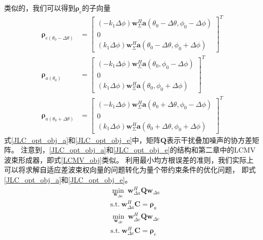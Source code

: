 \documentclass[master]{thesis-uestc}
\begin{document}
类似的，我们可以得到$\bm{\rho}_e$的子向量
\begin{subequations}\label{JLC_sub_cons_vec_e}
    \begin{align}
        \bm{\rho}_{e(\theta_0-\Delta\theta)} &= 
        \begin{bmatrix}
            (-k_1\Delta\phi)\bm{w}^H_\Sigma\bm{a}(\theta_0-\Delta\theta,\phi_0-\Delta\phi) \\
            0 \\
            (k_1\Delta\phi)\bm{w}^H_\Sigma\bm{a}(\theta_0-\Delta\theta,\phi_0+\Delta\phi)
        \end{bmatrix}^T \\
        \bm{\rho}_{a(\theta_0)} &= 
        \begin{bmatrix}
            (-k_1\Delta\phi)\bm{w}^H_\Sigma\bm{a}(\theta_0,\phi_0-\Delta\phi) \\
            0 \\
            (k_1\Delta\phi)\bm{w}^H_\Sigma\bm{a}(\theta_0,\phi_0+\Delta\phi)
        \end{bmatrix}^T \\
        \bm{\rho}_{a(\theta_0+\Delta\theta)} &= 
        \begin{bmatrix}
            (-k_1\Delta\phi)\bm{w}^H_\Sigma\bm{a}(\theta_0+\Delta\theta,\phi_0-\Delta\phi) \\
            0 \\
            (k_1\Delta\phi)\bm{w}^H_\Sigma\bm{a}(\theta_0+\Delta\theta,\phi_0+\Delta\phi)
        \end{bmatrix}^T
    \end{align}
\end{subequations}
式\eqref{JLC_opt_obj_a}和\eqref{JLC_opt_obj_e}中，矩阵$\bm{Q}$表示干扰叠加噪声的协方差矩阵。
注意到，\eqref{JLC_opt_obj_a}和\eqref{JLC_opt_obj_e}的结构和第二章中的LCMV波束形成器，即式\eqref{LCMV_obj}类似。
利用最小均方根误差的准则，我们实际上可以将求解自适应差波束权向量的问题转化为量个带约束条件的优化问题，
即式\eqref{JLC_opt_obj_a}和\eqref{JLC_opt_obj_e}。
\begin{equation}\label{JLC_opt_obj_a}
    \begin{aligned}
        &\min_{\bm{w}_{\Delta a}} ~ \bm{w}_{\Delta a}^H\bm{Q}\bm{w}_{\Delta a} \\
        &\text{s.t.} ~ \bm{w}_{\Delta a}^H\bm{C} = \bm{\rho}_a
    \end{aligned}
\end{equation}
\begin{equation}\label{JLC_opt_obj_e}
    \begin{aligned}
        &\min_{\bm{w}_{\Delta e}} ~ \bm{w}_{\Delta e}^H\bm{Q}\bm{w}_{\Delta e} \\
        &\text{s.t.} ~ \bm{w}_{\Delta e}^H\bm{C} = \bm{\rho}_e
    \end{aligned}
\end{equation}
\end{document}
